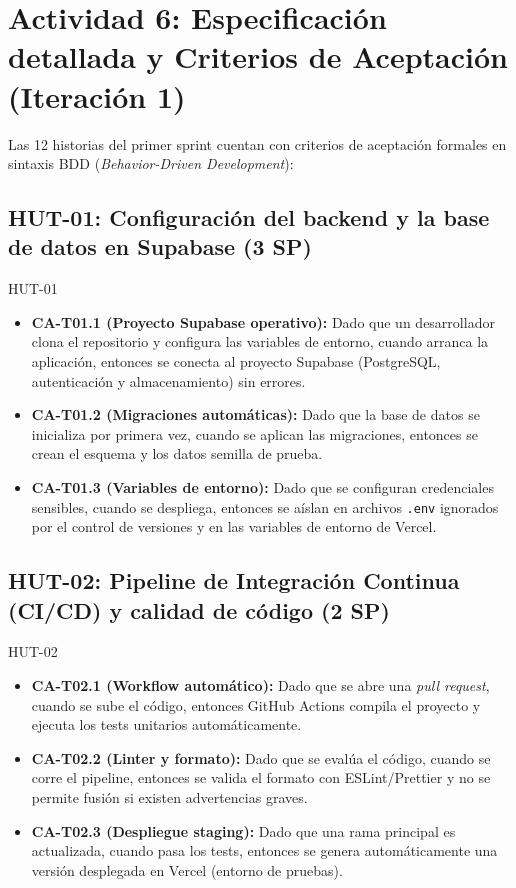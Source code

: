 \documentclass[11pt,a4paper]{article}
\newcommand{\ca}[2]{\item \textbf{#1:} #2}
\begin{document}
\section{Actividad 6: Especificación detallada y Criterios de Aceptación (Iteración 1)}
Las 12 historias del primer sprint cuentan con criterios de aceptación formales en sintaxis BDD (\textit{Behavior-Driven Development}):

\subsection{HUT-01: Configuración del backend y la base de datos en Supabase (3 SP)}
\begin{criterios}{HUT-01}
\begin{itemize}
\ca{CA-T01.1 (Proyecto Supabase operativo)}{Dado que un desarrollador clona el repositorio y configura las variables de entorno, cuando arranca la aplicación, entonces se conecta al proyecto Supabase (PostgreSQL, autenticación y almacenamiento) sin errores.}
\ca{CA-T01.2 (Migraciones automáticas)}{Dado que la base de datos se inicializa por primera vez, cuando se aplican las migraciones, entonces se crean el esquema y los datos semilla de prueba.}
\ca{CA-T01.3 (Variables de entorno)}{Dado que se configuran credenciales sensibles, cuando se despliega, entonces se aíslan en archivos \texttt{.env} ignorados por el control de versiones y en las variables de entorno de Vercel.}
\end{itemize}
\end{criterios}

\subsection{HUT-02: Pipeline de Integración Continua (CI/CD) y calidad de código (2 SP)}
\begin{criterios}{HUT-02}
\begin{itemize}
\ca{CA-T02.1 (Workflow automático)}{Dado que se abre una \textit{pull request}, cuando se sube el código, entonces GitHub Actions compila el proyecto y ejecuta los tests unitarios automáticamente.}
\ca{CA-T02.2 (Linter y formato)}{Dado que se evalúa el código, cuando se corre el pipeline, entonces se valida el formato con ESLint/Prettier y no se permite fusión si existen advertencias graves.}
\ca{CA-T02.3 (Despliegue staging)}{Dado que una rama principal es actualizada, cuando pasa los tests, entonces se genera automáticamente una versión desplegada en Vercel (entorno de pruebas).}
\end{itemize}
\end{criterios}
\end{document}
